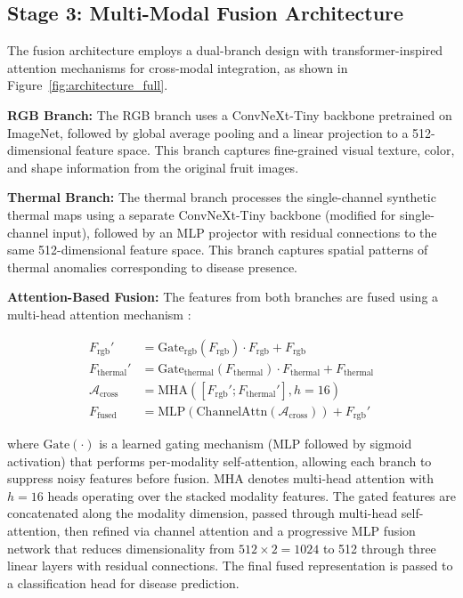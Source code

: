 \documentclass[utf8]{FrontiersinHarvard} %
\begin{document}
\subsection{Stage 3: Multi-Modal Fusion Architecture}
The fusion architecture employs a dual-branch design with transformer-inspired attention mechanisms for cross-modal integration, as shown in Figure~\ref{fig:architecture_full}.

\textbf{RGB Branch:} The RGB branch uses a ConvNeXt-Tiny \cite{liu2022convnext} backbone pretrained on ImageNet, followed by global average pooling and a linear projection to a 512-dimensional feature space. This branch captures fine-grained visual texture, color, and shape information from the original fruit images.

\textbf{Thermal Branch:} The thermal branch processes the single-channel synthetic thermal maps using a separate ConvNeXt-Tiny backbone \cite{liu2022convnext} (modified for single-channel input), followed by an MLP projector with residual connections to the same 512-dimensional feature space. This branch captures spatial patterns of thermal anomalies corresponding to disease presence.

\textbf{Attention-Based Fusion:} The features from both branches are fused using a multi-head attention mechanism \cite{vaswani2017,guo2022}:

\begin{align}
    F_{\text{rgb}}' &= \text{Gate}_{\text{rgb}}(F_{\text{rgb}}) \cdot F_{\text{rgb}} + F_{\text{rgb}} \label{eq:gate_rgb} \\
    F_{\text{thermal}}' &= \text{Gate}_{\text{thermal}}(F_{\text{thermal}}) \cdot F_{\text{thermal}} + F_{\text{thermal}} \label{eq:gate_thermal} \\
    \mathcal{A}_{\text{cross}} &= \text{MHA}([F_{\text{rgb}}'; F_{\text{thermal}}'], h{=}16) \label{eq:mha} \\
    F_{\text{fused}} &= \text{MLP}(\text{ChannelAttn}(\mathcal{A}_{\text{cross}})) + F_{\text{rgb}}' \label{eq:fused}
\end{align}

where $\text{Gate}(\cdot)$ is a learned gating mechanism (MLP followed by sigmoid activation) that performs per-modality self-attention, allowing each branch to suppress noisy features before fusion. MHA denotes multi-head attention with $h=16$ heads operating over the stacked modality features. The gated features are concatenated along the modality dimension, passed through multi-head self-attention, then refined via channel attention and a progressive MLP fusion network that reduces dimensionality from $512 \times 2 = 1024$ to 512 through three linear layers with residual connections. The final fused representation is passed to a classification head for disease prediction.
\end{document}
